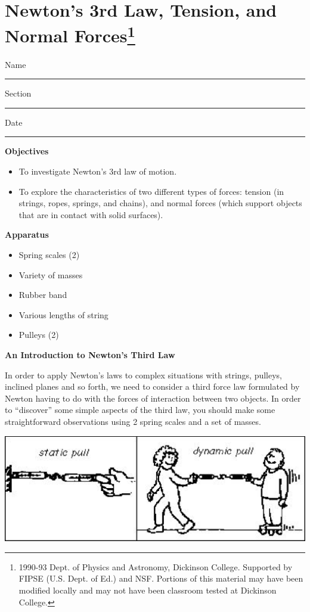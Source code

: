
\section{Newton's 3rd Law, Tension, and Normal Forces\footnote{
1990-93 Dept. of Physics and Astronomy, Dickinson College. Supported by FIPSE
(U.S. Dept. of Ed.) and NSF. Portions of this material may have been modified
locally and may not have been classroom tested at Dickinson College.
}}

Name \rule{2.0in}{0.1pt}\hfill{}Section \rule{1.0in}{0.1pt}\hfill{}Date \rule{1.0in}{0.1pt}

\textbf{Objectives }

\begin{itemize}
\item To investigate Newton's 3rd law of motion. 
\item To explore the characteristics of two different types of forces: tension
(in strings, ropes, springs, and chains), and normal forces (which support objects
that are in contact with solid surfaces).
\end{itemize}
\textbf{Apparatus} 

\begin{itemize}
\item Spring scales (2) 
\item Variety of masses 
\item Rubber band 
\item Various lengths of string 
\item Pulleys (2)
\end{itemize}
\textbf{An Introduction to Newton's Third Law }

In order to apply Newton's laws to complex situations with strings, pulleys,
inclined planes and so forth, we need to consider a third force law formulated
by Newton having to do with the forces of interaction between two objects. In
order to ``discover'' some simple aspects of the third law,
you should make some straightforward observations using 2 spring scales and
a set of masses.

\vspace{0.3cm}
{\par\centering \includegraphics{newton/newton_fig1.eps} \par}
\vspace{0.3cm}

